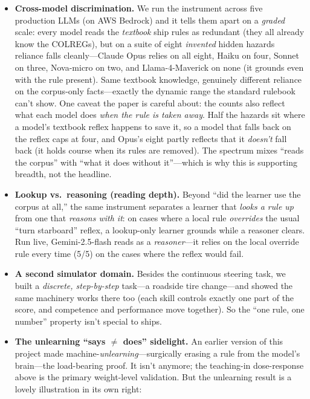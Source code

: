 \documentclass[11pt]{article}
\begin{document}
\begin{itemize}[leftmargin=1.4em]
  \item \textbf{Cross-model discrimination.} We run the instrument across five production LLMs (on
  AWS Bedrock) and it tells them apart on a \emph{graded} scale: every model reads the
  \emph{textbook} ship rules as redundant (they all already know the COLREGs), but on a suite of
  eight \emph{invented} hidden hazards reliance falls cleanly---Claude Opus relies on all eight,
  Haiku on four, Sonnet on three, Nova-micro on two, and Llama-4-Maverick on none (it grounds even
  with the rule present). Same textbook knowledge, genuinely different reliance on the corpus-only
  facts---exactly the dynamic range the standard rulebook can't show. One caveat the paper is careful
  about: the counts also reflect what each model does \emph{when the rule is taken away}. Half the
  hazards sit where a model's textbook reflex happens to save it, so a model that falls back on the
  reflex caps at four, and Opus's eight partly reflects that it \emph{doesn't} fall back (it holds
  course when its rules are removed). The spectrum mixes ``reads the corpus'' with ``what it does
  without it''---which is why this is supporting breadth, not the headline.
  \item \textbf{Lookup vs.\ reasoning (reading depth).} Beyond ``did the learner use the corpus at
  all,'' the same instrument separates a learner that \emph{looks a rule up} from one that
  \emph{reasons with it}: on cases where a local rule \emph{overrides} the usual ``turn starboard''
  reflex, a lookup-only learner grounds while a reasoner clears. Run live, Gemini-2.5-flash reads as
  a \emph{reasoner}---it relies on the local override rule every time (5/5) on the cases where the
  reflex would fail.
  \item \textbf{A second simulator domain.} Besides the continuous steering task, we built a
  \emph{discrete, step-by-step} task---a roadside tire change---and showed the same machinery
  works there too (each skill controls exactly one part of the score, and competence and
  performance move together). So the ``one rule, one number'' property isn't special to ships.
  \item \textbf{The unlearning ``says $\ne$ does'' sidelight.} An earlier version of this project
  made machine-\emph{unlearning}---surgically erasing a rule from the model's brain---the
  load-bearing proof. It isn't anymore; the teaching-in dose-response above is the primary
  weight-level validation. But the unlearning result is a lovely illustration in its own right:

\end{itemize}
\end{document}
